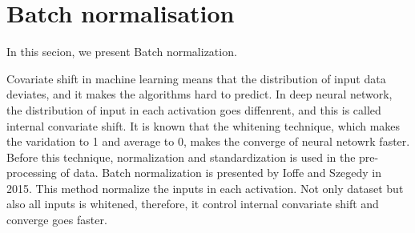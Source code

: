 \documentclass{article}
\begin{document}
%
%

\section{Batch normalisation}
In this secion, we present Batch normalization.

Covariate shift in machine learning means that the distribution of input data deviates, and it makes the algorithms hard to predict.
In deep neural network, the distribution of input in each activation goes diffenrent, and this is called internal convariate shift.
It is known that the whitening technique, which makes the varidation to 1 and average to 0, makes the converge of neural netowrk faster. Before this technique, normalization and standardization is used in the pre-processing of data.
Batch normalization is presented by Ioffe and Szegedy in 2015. This method normalize the inputs in each activation. Not only dataset but also all inputs is whitened, therefore, it control internal convariate shift and converge goes faster.
\end{document}
